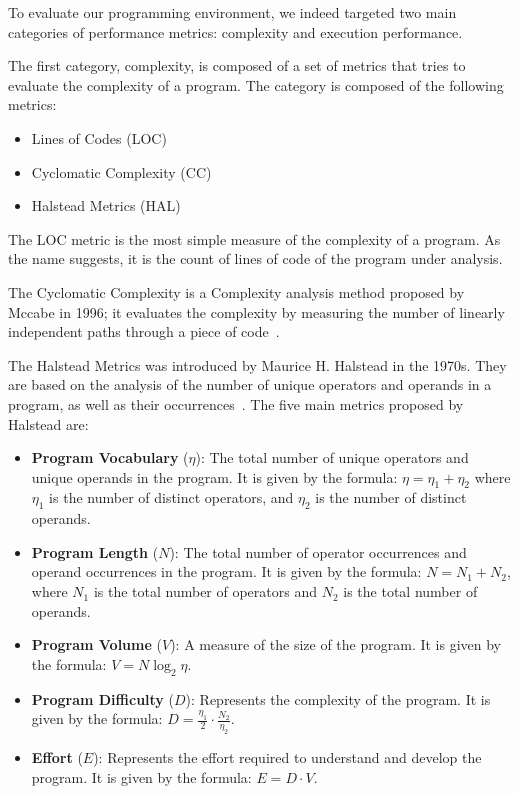 To evaluate our programming environment, we indeed targeted two main categories of performance metrics: complexity and execution performance.

The first category, complexity, is composed of a set of metrics that tries to evaluate the complexity of a program.
The category is composed of the following metrics:
\begin{itemize}
    \item Lines of Codes (LOC)
    \item Cyclomatic Complexity (CC)
    \item Halstead Metrics (HAL)
\end{itemize}

The LOC metric is the most simple measure of the complexity of a program. As the name suggests, it is the count of lines of code of the program under analysis.

The Cyclomatic Complexity is a Complexity analysis method proposed by Mccabe in 1996; it evaluates the complexity by measuring the number of linearly independent paths
through a piece of code~\cite{mccabe1996cyclomatic}.

The Halstead Metrics was introduced by Maurice H. Halstead in the 1970s. 
They are based on the analysis of the number of unique operators and operands in a program, as well as their occurrences~\cite{hariprasad2017software}.
The five main metrics proposed by Halstead are:
\begin{itemize}
    \item \textbf{Program Vocabulary} (\( \eta \)): The total number of unique operators and unique operands in the program. 
    It is given by the formula: \( \eta = \eta_1 + \eta_2 \) where \( \eta_1 \) is the number of distinct operators, and  \( \eta_2 \) is the number of distinct operands.
    \item \textbf{Program Length} (\( N \)): The total number of operator occurrences and operand occurrences in the program. It is given by the formula: \( N = N_1 + N_2 \), where \( N_1 \) is the total number of operators and \( N_2 \) is the total number of operands.
    \item \textbf{Program Volume} (\( V \)): A measure of the size of the program. It is given by the formula: \( V = N \log_2 \eta \).
    \item \textbf{Program Difficulty} (\( D \)): Represents the complexity of the program. It is given by the formula: \( D = \frac{\eta_1}{2} \cdot \frac{N_2}{\eta_2} \).
    \item \textbf{Effort} (\( E \)): Represents the effort required to understand and develop the program. It is given by the formula: \( E = D \cdot V \).
\end{itemize}

